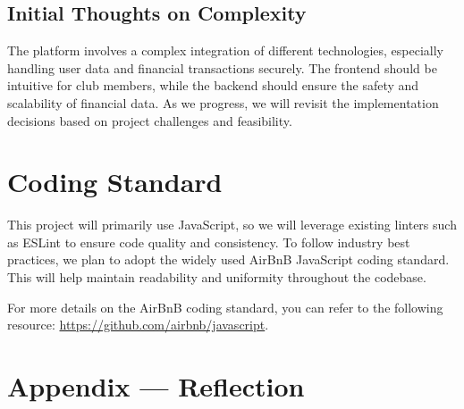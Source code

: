 \documentclass{article}
\begin{document}
\subsection{Initial Thoughts on Complexity}
The platform involves a complex integration of different technologies, especially handling user data and financial transactions securely. The frontend should be intuitive for club members, while the backend should ensure the safety and scalability of financial data. As we progress, we will revisit the implementation decisions based on project challenges and feasibility.


\section{Coding Standard}

This project will primarily use JavaScript, so we will leverage existing linters such as ESLint to ensure code quality and consistency. To follow industry best practices, we plan to adopt the widely used AirBnB JavaScript coding standard. This will help maintain readability and uniformity throughout the codebase.

For more details on the AirBnB coding standard, you can refer to the following resource: \url{https://github.com/airbnb/javascript}.

\section*{Appendix --- Reflection}



\end{document}
